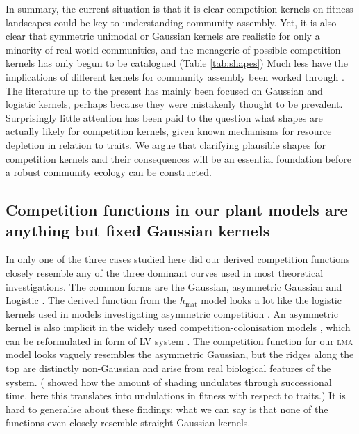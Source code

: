 \documentclass[a4paper,11pt]{article}
\begin{document}
In summary, the current situation is that it is clear competition kernels on
fitness landscapes could be key to understanding community assembly. Yet, it
is also clear that symmetric unimodal or Gaussian kernels are realistic for
only a minority of real-world communities, and the menagerie of possible
competition kernels has only begun to be catalogued (Table \ref{tab:shapes})
\citep{Barabas-2012,Leimar-2013} 
Much less have the
implications of different kernels for community assembly been worked through
\citep{Barabas-2012,Barabas-2013,DAndrea-2013,Leimar-2013}.
The literature up to the present has mainly been focused on Gaussian and
logistic kernels, perhaps because they were mistakenly thought to be
prevalent. Surprisingly little attention has been paid to the question what
shapes are actually likely for competition kernels, given known mechanisms for
resource depletion in relation to traits. We argue that clarifying plausible
shapes for competition kernels and their consequences will be an essential
foundation before a robust community ecology can be constructed.

\subsection{Competition functions in our plant models are anything but fixed 
Gaussian kernels}

In only one of the three cases studied here did our derived competition
functions closely resemble any of the three dominant curves used in most
theoretical investigations. The common forms are the Gaussian, asymmetric
Gaussian \citet{Roughgarden-1979} and Logistic  \citep[e.g.][]{Kisdi-1999,
Law-1997}. The derived function from the $h_\mathrm{mat}$ model looks a lot
like the logistic kernels used in models investigating asymmetric competition
\citep{Kisdi-1999, Law-1997}.  An asymmetric kernel is also implicit in
the widely used competition-colonisation models  \citep{Geritz-1999,
Calcagno-2006}, which can be reformulated in form of LV system
\citep{Calcagno-2006}. The competition function for our \textsc{lma} model looks
vaguely resembles the asymmetric Gaussian, but the ridges along the top are
distinctly non-Gaussian and arise from real biological features of the system. 
(\citet{Falster-2011} showed how the amount of shading undulates through 
successional time. here this translates into undulations in fitness with
respect to traits.) It is hard to generalise about these findings; what we
can say is that none of the functions even closely resemble straight Gaussian
kernels. 
\end{document}
